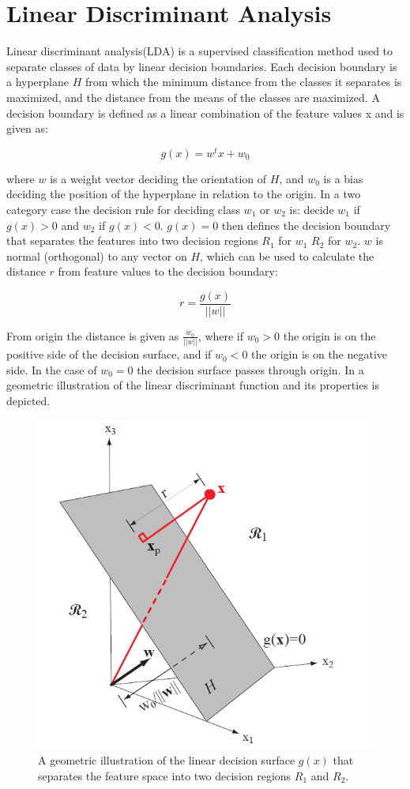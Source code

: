 \section{Linear Discriminant Analysis}

Linear discriminant analysis(LDA) is a supervised classification method used to separate classes of data by linear decision boundaries. Each decision boundary is a hyperplane $H$ from which the minimum distance from the classes it separates is maximized, and the distance from the means of the classes are maximized. A decision boundary is defined as a linear combination of the feature values x and is given as:

\begin{equation}
g(x) = w^tx +w_0
\end{equation}

where $w$ is a weight vector deciding the orientation of $H$, and $w_0$ is a bias deciding the position of the hyperplane in relation to the origin. In a two category case the decision rule for deciding class $w_1$ or $w_2$ is: decide $w_1$ if $g(x) > 0$ and $w_2$ if $g(x) < 0$. $g(x) = 0$ then defines the decision boundary that separates the features into two decision regions $R_1$ for $w_1$ $R_2$ for $w_2$. $w$ is normal (orthogonal) to any vector on $H$, which can be used to calculate the distance $r$ from feature values to the decision boundary:

\begin{equation}
r = \frac{g(x)}{||w||}
\end{equation} 

From origin the distance is given as $\frac{w_0}{||w||}$, where if $w_0 > 0$ the origin is on the positive side of the decision surface, and if $w_0 < 0$ the origin is on the negative side. In the case of $w_0 = 0$ the decision surface passes through origin. In  a geometric illustration of the linear discriminant function and its properties  is depicted.

\begin{figure}[H]                 
	\includegraphics[width=.4\textwidth]{figures/xBackground/geolda}  
	\caption{A geometric illustration of the linear decision surface $g(x)$ that separates the feature space into two decision regions $R_1$ and $R_2$. \cite{Duda2000}}
	\label{fig:geolda} 
\end{figure}

